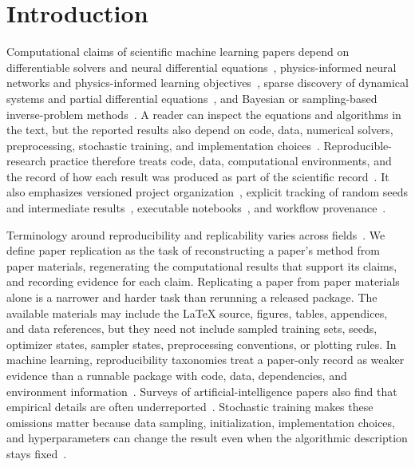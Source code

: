 \documentclass[authoryear,5p,times,nopreprintline]{elsarticle}
\begin{document}
\section{Introduction}\label{sec:intro}
Computational claims of scientific machine learning papers depend on differentiable solvers and neural differential equations~\citep{chen2018neural,rackauckas2020universal,hans2023stochastic,hans2024bayesian}, physics-informed neural networks and physics-informed learning objectives~\citep{raissi2019physics,karniadakis2021physics}, sparse discovery of dynamical systems and partial differential equations~\citep{brunton2016discovering,rudy2017data}, and Bayesian or sampling-based inverse-problem methods~\citep{stuart2010inverse,hans2020quantifying,hans2023bayesian,alberts2023physics}.
A reader can inspect the equations and algorithms in the text, but the reported results also depend on code, data, numerical solvers, preprocessing, stochastic training, and implementation choices~\citep{hans2024scalable,hans2025smurf}.
Reproducible-research practice therefore treats code, data, computational environments, and the record of how each result was produced as part of the scientific record~\citep{peng2011reproducible,stodden2016enhancing}.
It also emphasizes versioned project organization~\citep{wilson2017good}, explicit tracking of random seeds and intermediate results~\citep{sandve2013ten}, executable notebooks~\citep{kluyvertextordfeminine12016jupyter}, and workflow provenance~\citep{davidson2008provenance,belhajjame2013prov,goecks2010galaxy}.

Terminology around reproducibility and replicability varies across fields~\citep{barba2018terminologies}.
We define paper replication as the task of reconstructing a paper's method from paper materials, regenerating the computational results that support its claims, and recording evidence for each claim.
Replicating a paper from paper materials alone is a narrower and harder task than rerunning a released package.
The available materials may include the \LaTeX{} source, figures, tables, appendices, and data references, but they need not include sampled training sets, seeds, optimizer states, sampler states, preprocessing conventions, or plotting rules.
In machine learning, reproducibility taxonomies treat a paper-only record as weaker evidence than a runnable package with code, data, dependencies, and environment information~\citep{tatman2018practical}.
Surveys of artificial-intelligence papers also find that empirical details are often underreported~\citep{gundersen2018state}.
Stochastic training makes these omissions matter because data sampling, initialization, implementation choices, and hyperparameters can change the result even when the algorithmic description stays fixed~\citep{henderson2018deep,bouthillier2021accounting,pineau2021improving}.
\end{document}
